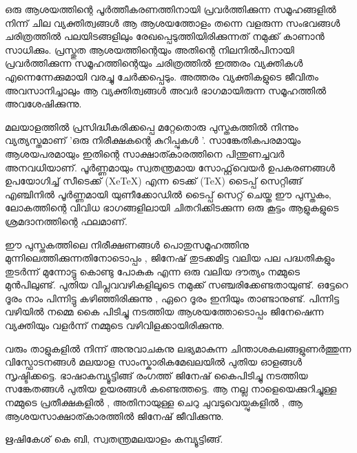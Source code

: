 
ഒരു ആശയത്തിന്റെ പൂര്‍ത്തീകരണത്തിനായി പ്രവര്‍ത്തിക്കുന്ന സമൂഹങ്ങളില്‍ നിന്ന് ചില വ്യക്തിത്വങ്ങള്‍ ആ ആശയത്തോളം  തന്നെ
വളരുന്ന സംഭവങ്ങള്‍ ചരിത്രത്തില്‍ പലയിടങ്ങളിലും  രേഖപ്പെടുത്തിയിരിക്കുന്നത് നമുക്ക് കാണാന്‍ സാധിക്കും. പ്രസ്തുത ആശയത്തിന്റെയും  
അതിന്റെ നിലനില്‍പിനായി പ്രവര്‍ത്തിക്കുന്ന സമൂഹത്തിന്റെയും  ചരിത്രത്തില്‍ ഇത്തരം  വ്യക്തികള്‍ എന്നെന്നേക്കുമായി വരച്ചു ചേര്‍ക്കപ്പെടും. 
അത്തരം  വ്യക്തികളുടെ ജീവിതം  അവസാനിച്ചാലും  ആ വ്യക്തിത്വങ്ങള്‍ അവര്‍ ഭാഗമായിരുന്ന  സമൂഹത്തില്‍ അവശേഷിക്കുന്നു. 


മലയാളത്തില്‍ പ്രസിദ്ധീകരിക്കപ്പെ മറ്റേതൊരു പുസ്തകത്തില്‍ നിന്നും  വ്യത്യസ്തമാണ് 'ഒരു നിരീക്ഷകന്റെ കുറിപ്പുകള്‍ '. 
സാങ്കേതികപരമായും  ആശയപരമായും  ഇതിന്റെ സാക്ഷാത്കാരത്തിനെ പിന്തുണച്ചവര്‍ അനവധിയാണ്. പൂര്‍ണ്ണമായും  സ്വതന്ത്രമായ 
സോഫ്റ്റ്‌‌വെയര്‍ ഉപകരണങ്ങള്‍ ഉപയോഗിച്ച് സീടെക്ക് (XeTeX) എന്ന ടെക്ക് (TeX) ടൈപ്പ് സെറ്റിങ്ങ് എഞ്ചിനില്‍ പൂര്‍ണ്ണമായി യുണീക്കോഡില്‍ ടൈപ്പ് സെറ്റ് ചെയ്ത
ഈ പുസ്തകം, ലോകത്തിന്റെ വിവിധ ഭാഗങ്ങളിലായി ചിതറിക്കിടക്കുന്ന ഒരു കൂട്ടം  ആളുകളുടെ ശ്രമദാനത്തിന്റെ ഫലമാണ്.   

ഈ പുസ്തകത്തിലെ നിരീക്ഷണങ്ങള്‍ പൊതുസമൂഹത്തിനു മുന്നിലെത്തിക്കുന്നതിനോടൊപ്പം , ജിനേഷ് തുടക്കമിട്ട  വലിയ പല പദ്ധതികളും  
തുടര്‍ന്ന് മുന്നോട്ടു കൊണ്ടു പോകുക എന്ന ഒരു വലിയ ദൗത്യം  നമ്മുടെ മുന്‍പിലുണ്ട്. പുതിയ വിപ്ലവവഴികളിലൂടെ നമുക്ക് സഞ്ചരിക്കേണ്ടതായുണ്ട്. 
ഒട്ടേറെ ദൂരം  നാം  പിന്നിട്ടു കഴിഞ്ഞിരിക്കുന്നു , ഏറെ ദൂരം  ഇനിയും  താണ്ടാനുണ്ട്.  പിന്നിട്ട വഴിയില്‍ നമ്മെ കൈ പിടിച്ചു നടത്തിയ ആശയത്തോടൊപ്പം  
ജിനേഷെന്ന വ്യക്തിയും  വളര്‍ന്ന് നമ്മുടെ വഴിവിളക്കായിരിക്കുന്നു.

വരും  താളുകളില്‍ നിന്ന് അനുവാചകനു ലഭ്യമാകുന്ന ചിന്താശകലങ്ങളുണര്‍ത്തുന്ന വിസ്ഫോടനങ്ങള്‍ മലയാള സാംസ്കാരികമേഖലയില്‍ പുതിയ ഓളങ്ങള്‍ സൃഷ്ടിക്കട്ടെ. 
ഭാഷാകമ്പ്യൂട്ടിങ്ങ് രംഗത്ത് ജിനേഷ് കൈപിടിച്ചു നടത്തിയ സങ്കേതങ്ങള്‍ പുതിയ ഉയരങ്ങള്‍ കണ്ടെത്തട്ടെ.  ആ നല്ല നാളെയെക്കുറിച്ചുള്ള നമ്മുടെ പ്രതീക്ഷകളില്‍ ,
അതിനായുള്ള ചെറു ചുവടുവെയ്പുകളില്‍ , ആ ആശയസാക്ഷാത്കാരത്തില്‍ ജിനേഷ് ജീവിക്കുന്നു. 

\hspace*{2em}ഋഷികേശ് കെ ബി,  സ്വതന്ത്രമലയാളം കമ്പ്യൂട്ടിങ്ങ്. 
\newpage



